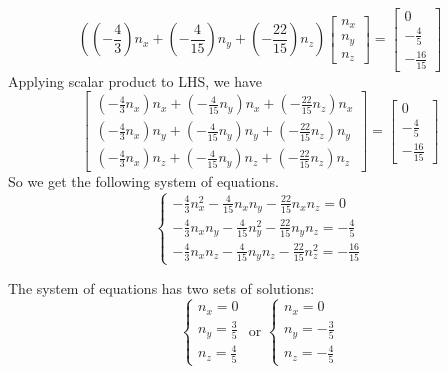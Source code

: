 \documentclass[12pt,a4paper]{article}
\begin{document}
\begin{solution}
\begin{equation}
\left( \left( -\frac{4}{3} \right) n_x + \left( -\frac{4}{15} \right) n_y + \left( -\frac{22}{15} \right) n_z \right)
\left[ \begin{array}{c}
n_x \\
n_y \\
n_z
\end{array} \right]
=
\left[ \begin{array}{c}
0 \\
-\frac{4}{5} \\
-\frac{16}{15}
\end{array} \right]
\end{equation}
Applying scalar product to LHS, we have
\begin{equation}
\left[ \begin{array}{c}
\left( -\frac{4}{3} n_x \right) n_x + \left( -\frac{4}{15} n_y \right) n_x + \left( -\frac{22}{15} n_z \right) n_x \\
\left( -\frac{4}{3} n_x \right) n_y + \left( -\frac{4}{15} n_y \right) n_y + \left( -\frac{22}{15} n_z \right) n_y \\
\left( -\frac{4}{3} n_x \right) n_z + \left( -\frac{4}{15} n_y \right) n_z + \left( -\frac{22}{15} n_z \right) n_z
\end{array} \right]
=
\left[ \begin{array}{c}
0 \\
-\frac{4}{5} \\
-\frac{16}{15}
\end{array} \right]
\end{equation}
So we get the following system of equations.
\begin{equation}
\begin{cases}
-\frac{4}{3} n_x^2 - \frac{4}{15} n_x n_y - \frac{22}{15} n_x n_z = 0 \\
-\frac{4}{3} n_x n_y - \frac{4}{15} n_y^2 - \frac{22}{15} n_y n_z = -\frac{4}{5} \\
-\frac{4}{3} n_x n_z - \frac{4}{15} n_y n_z - \frac{22}{15} n_z^2 = -\frac{16}{15}
\end{cases}
\end{equation}

The system of equations has two sets of solutions:
$$\left\{\begin{array}{l}
n_x=0 \\
n_y=\frac{3}{5} \\
n_z=\frac{4}{5}
\end{array}\right.\text{ or }
\left\{\begin{array}{l}
n_x=0 \\
n_y=-\frac{3}{5} \\
n_z=-\frac{4}{5}
\end{array}\right.
$$


\end{solution}
\end{document}
